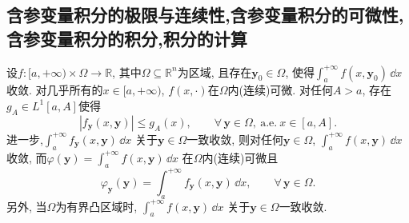 \subsection{含参变量积分的极限与连续性,含参变量积分的可微性,含参变量积分的积分,积分的计算}
\begin{theorem}\label{chang}
设\(f:[a,+\infty)\times\varOmega\rightarrow\mathbb{R}\), 
其中\(\varOmega\subseteq\mathbb{R}^n\)为区域, 
且存在\(\boldsymbol{y}_0\in\varOmega\), 
使得\(\int_{a}^{+\infty}f(x,\boldsymbol{y}_0)\,\dd x\)收敛. 
对几乎所有的\(x\in[a,+\infty)\), \(f(x,\cdot)\)在\(\varOmega\)内(连续)可微. 
对任何\(A>a\), 存在\(g_A\in L^1[a,A]\)使得
\[\left|f_{\boldsymbol{y}}(x,\boldsymbol{y})\right|\leqslant g_A(x),\qquad\forall\,\boldsymbol{y}\in\varOmega,\ \mathrm{a.e.}\ x\in[a,A].\]
进一步,\(\int_{a}^{+\infty}f_{\boldsymbol{y}}(x,\boldsymbol{y})\,\dd x\)
关于\(\boldsymbol{y}\in\varOmega\)一致收敛, 则对任何\(\boldsymbol{y}\in\varOmega\),
\(\int_{a}^{+\infty}f(x,\boldsymbol{y})\,\dd x\)收敛, 
而\(\varphi(\boldsymbol{y})=\int_{a}^{+\infty}f(x,\boldsymbol{y})\,\dd x\)
在\(\varOmega\)内(连续)可微且
\[\varphi_{\boldsymbol{y}}(\boldsymbol{y})
=\int_{a}^{+\infty}f_{\boldsymbol{y}}(x,\boldsymbol{y})\,\dd x,
\qquad\forall\,\boldsymbol{y}\in\varOmega.\]
另外, 当\(\varOmega\)为有界凸区域时, \(\int_{a}^{+\infty}f(x,\boldsymbol{y})\,\dd x\)
关于\(\boldsymbol{y}\in\varOmega\)一致收敛.
\end{theorem}
